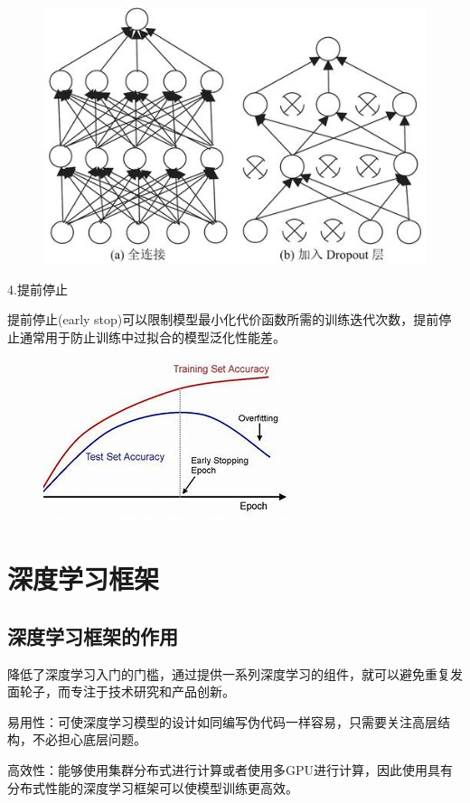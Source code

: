 \documentclass[openbib]{article}
\begin{document}
\begin{figure}[htbp]
	\centering
	\includegraphics[scale=2.7]{Dropout.jpg}
\end{figure}
\begin{center}
	4.提前停止
\end{center}
提前停止(early stop)可以限制模型最小化代价函数所需的训练迭代次数，提前停止通常用于防止训练中过拟合的模型泛化性能差。
\begin{figure}[htbp]
	\centering
	\includegraphics[scale=0.5]{early stop}
\end{figure}
\section{深度学习框架}
\subsection{深度学习框架的作用}
降低了深度学习入门的门槛，通过提供一系列深度学习的组件，就可以避免重复发面轮子，而专注于技术研究和产品创新。

易用性：可使深度学习模型的设计如同编写伪代码一样容易，只需要关注高层结构，不必担心底层问题。

高效性：能够使用集群分布式进行计算或者使用多GPU进行计算，因此使用具有分布式性能的深度学习框架可以使模型训练更高效。
\end{document}
